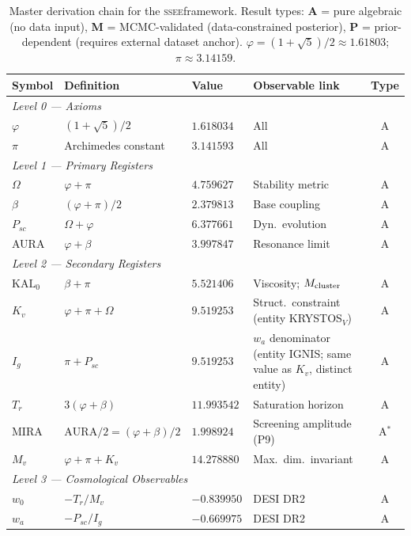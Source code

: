 \documentclass[12pt,a4paper]{article}
\newcommand{\SSEE}{\ifmmode\mathrm{SSEE}\else\textsc{ssee}\fi}
\begin{document}
\begin{table}[p]
\centering
\caption{Master derivation chain for the \SSEE framework.
  Result types: \textbf{A} = pure algebraic (no data input),
  \textbf{M} = MCMC-validated (data-constrained posterior),
  \textbf{P} = prior-dependent (requires external dataset anchor).
  $\varphi = (1+\sqrt{5})/2 \approx 1.61803$;
  $\pi \approx 3.14159$.}
\label{tab:derivation_chain}
\footnotesize
\begin{tabularx}{\textwidth}{p{2.2cm}p{3.8cm}p{2.4cm}Xc}
\toprule
Symbol & Definition & Value & Observable link & Type \\
\midrule
\multicolumn{5}{l}{\textit{Level 0 — Axioms}} \\
$\varphi$ & $(1+\sqrt{5})/2$ & $1.618034$ & All & A \\
$\pi$     & Archimedes constant & $3.141593$ & All & A \\
\midrule
\multicolumn{5}{l}{\textit{Level 1 — Primary Registers}} \\
$\Omega$ & $\varphi + \pi$ & $4.759627$ & Stability metric & A \\
$\beta$   & $(\varphi+\pi)/2$ & $2.379813$ & Base coupling & A \\
$P_{sc}$  & $\Omega+\varphi$ & $6.377661$ & Dyn.\ evolution & A \\
AURA      & $\varphi+\beta$ & $3.997847$ & Resonance limit & A \\
\midrule
\multicolumn{5}{l}{\textit{Level 2 — Secondary Registers}} \\
$\mathrm{KAL}_0$ & $\beta+\pi$ & $5.521406$ & Viscosity; $M_{\rm cluster}$ & A \\
$K_v$     & $\varphi+\pi+\Omega$ & $9.519253$ & Struct.\ constraint (entity KRYSTOS$_V$) & A \\
$I_g$     & $\pi+P_{sc}$ & $9.519253$ & $w_a$ denominator (entity IGNIS; same value as $K_v$, distinct entity) & A \\
$T_r$     & $3(\varphi+\beta)$ & $11.993542$ & Saturation horizon & A \\
MIRA      & $\mathrm{AURA}/2 = (\varphi+\beta)/2$ & $1.998924$ & Screening amplitude (P9) & A$^*$ \\
$M_v$     & $\varphi+\pi+K_v$ & $14.278880$ & Max.\ dim.\ invariant & A \\
\midrule
\multicolumn{5}{l}{\textit{Level 3 — Cosmological Observables}} \\
$w_0$     & $-T_r/M_v$ & $-0.839950$ & DESI DR2 & A \\
$w_a$     & $-P_{sc}/I_g$ & $-0.669975$ & DESI DR2 & A \\

\end{tabularx}
\end{table}
\end{document}
